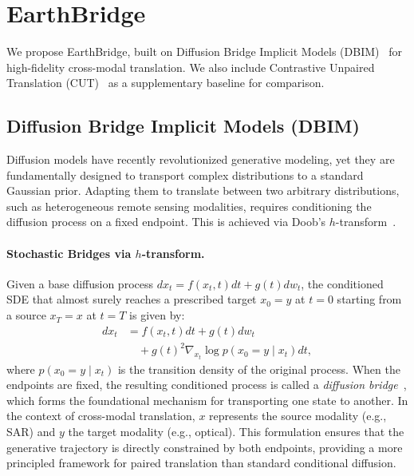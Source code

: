 \section{EarthBridge}
\label{sec:method}

We propose EarthBridge, built on Diffusion Bridge Implicit Models (DBIM)~\cite{zhengDiffusionBridgeImplicit2025} for high-fidelity cross-modal translation. We also include Contrastive Unpaired Translation (CUT)~\cite{parkContrastiveLearningUnpaired2020} as a supplementary baseline for comparison.

\subsection{Diffusion Bridge Implicit Models (DBIM)}
\label{sec:dbim_formalism}

Diffusion models have recently revolutionized generative modeling, yet they are fundamentally designed to transport complex distributions to a standard Gaussian prior. Adapting them to translate between two arbitrary distributions, such as heterogeneous remote sensing modalities, requires conditioning the diffusion process on a fixed endpoint. This is achieved via Doob's $h$-transform~\cite{doob1984classical,rogers2000diffusions}.

\paragraph{Stochastic Bridges via $h$-transform.}
Given a base diffusion process $dx_t = f(x_t, t)dt + g(t)dw_t$, the conditioned SDE that almost surely reaches a prescribed target $x_0 = y$ at $t=0$ starting from a source $x_T = x$ at $t=T$ is given by:
\begin{align}
    dx_t &= f(x_t, t)dt + g(t)dw_t \nonumber \\
    &\quad + g(t)^2 \nabla_{x_t} \log p(x_0 = y \mid x_t)dt,
    \label{eq:bridge_sde}
\end{align}
where $p(x_0 = y \mid x_t)$ is the transition density of the original process. When the endpoints are fixed, the resulting conditioned process is called a \emph{diffusion bridge}~\cite{sarkka2019applied,heng2021simulating,delyon2006simulation,schauer2017guided,peluchettinon,liu2022let}, which forms the foundational mechanism for transporting one state to another. In the context of cross-modal translation, $x$ represents the source modality (e.g., SAR) and $y$ the target modality (e.g., optical). This formulation ensures that the generative trajectory is directly constrained by both endpoints, providing a more principled framework for paired translation than standard conditional diffusion.

